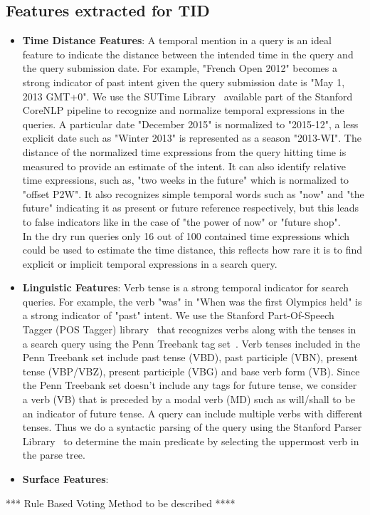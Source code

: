 \documentclass{sig-alternate}
\begin{document}
\subsection{Features extracted for TID}
\begin{itemize}
\item \textbf{Time Distance Features}: A temporal mention in a query is an ideal feature to indicate the distance between the intended time in the query and the query submission date. For example, "French Open 2012" becomes a strong indicator of past intent given the query submission date is "May 1, 2013 GMT+0". We use the SUTime Library~\cite{sutime} available part of the Stanford CoreNLP pipeline to recognize and normalize temporal expressions in the queries. A particular date "December 2015" is normalized to "2015-12", a less explicit date such as "Winter 2013" is represented as a season "2013-WI". The distance of the normalized time expressions from the query hitting time is measured to provide an estimate of the intent. It can also identify relative time expressions, such as, "two weeks in the future" which is normalized to "offset P2W". It also recognizes simple temporal words such as "now" and "the future" indicating it as present or future reference respectively, but this leads to false indicators like in the case of "the power of now" or "future shop". 
\\
In the dry run queries only 16 out of 100 contained time expressions which could be used to estimate the time distance, this reflects how rare it is to find explicit or implicit temporal expressions in a search query.  
\item \textbf{Linguistic Features}:
Verb tense is a strong temporal indicator for search queries. For example, the verb "was" in "When was the first Olympics held" is a strong indicator of "past" intent. We use the Stanford Part-Of-Speech Tagger (POS Tagger) library~\cite{postagger} that recognizes verbs along with the tenses in a search query using the Penn Treebank tag set~\cite{penn}. Verb tenses included in the Penn Treebank set include past tense (VBD), past participle (VBN), present tense (VBP/VBZ), present participle (VBG) and base verb form (VB). Since the Penn Treebank set doesn't include any tags for future tense, we consider a verb (VB) that is preceded by a modal verb (MD) such as will/shall to be an indicator of future tense. A query can include multiple verbs with different tenses. Thus we do a syntactic parsing of the query using the Stanford Parser Library~\cite{parser} to determine the main predicate by selecting the uppermost verb in the parse tree. 
\item \textbf{Surface Features}:
 
\end{itemize}
*** Rule Based Voting Method to be described ****
\end{document}
